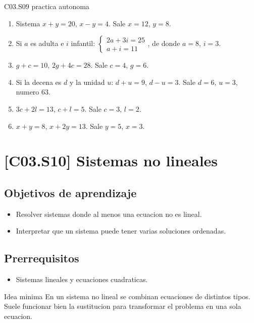 \begin{fullsolution}{C03.S09 practica autonoma}
\begin{enumerate}[label=\textbf{PX-C03.S09-\arabic*:}, leftmargin=*]
  \item Sistema \(x+y=20\), \(x-y=4\). Sale \(x=12\), \(y=8\).
  \item Si \(a\) es adulta e \(i\) infantil: \(\begin{cases}2a+3i=25\\ a+i=11\end{cases}\), de donde \(a=8\), \(i=3\).
  \item \(g+c=10\), \(2g+4c=28\). Sale \(c=4\), \(g=6\).
  \item Si la decena es \(d\) y la unidad \(u\): \(d+u=9\), \(d-u=3\). Sale \(d=6\), \(u=3\), numero \(63\).
  \item \(3c+2l=13\), \(c+l=5\). Sale \(c=3\), \(l=2\).
  \item \(x+y=8\), \(x+2y=13\). Sale \(y=5\), \(x=3\).
\end{enumerate}
\end{fullsolution}

\section{[C03.S10] Sistemas no lineales}

\subsection*{Objetivos de aprendizaje}
\begin{itemize}
  \item Resolver sistemas donde al menos una ecuacion no es lineal.
  \item Interpretar que un sistema puede tener varias soluciones ordenadas.
\end{itemize}

\subsection*{Prerrequisitos}
\begin{itemize}
  \item Sistemas lineales y ecuaciones cuadraticas.
\end{itemize}

\begin{theorybox}{Idea minima}
En un sistema no lineal se combinan ecuaciones de distintos tipos. Suele funcionar bien la
sustitucion para transformar el problema en una sola ecuacion.
\end{theorybox}

